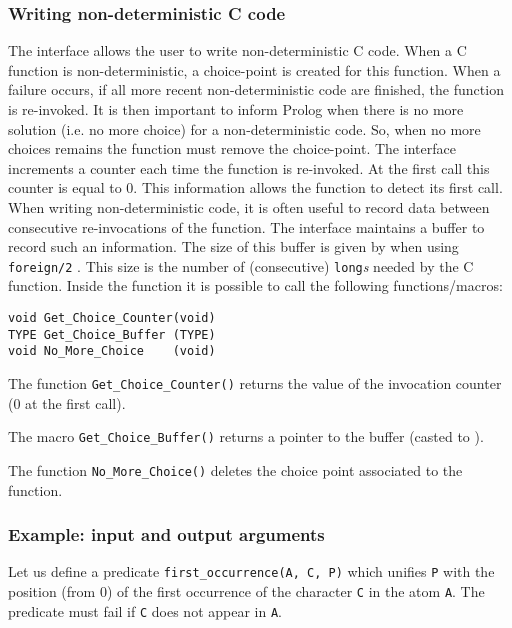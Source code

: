 \subsubsection{Writing non-deterministic C code}
\label{Writing-non-deterministic-C-code}
The interface allows the user to write non-deterministic C code. When a C
function is non-deterministic, a choice-point is created for this function.
When a failure occurs, if all more recent non-deterministic code are
finished, the function is re-invoked. It is then important to inform Prolog
when there is no more solution (i.e. no more choice) for a non-deterministic
code. So, when no more choices remains the function must remove the
choice-point. The interface increments a counter each time the function is
re-invoked. At the first call this counter is equal to 0. This information
allows the function to detect its first call. When writing non-deterministic
code, it is often useful to record data between consecutive re-invocations
of the function. The interface maintains a buffer to record such an
information. The size of this buffer is given by
 when using \texttt{foreign/2}
. This size is the number of (consecutive)
\texttt{long}\emph{s} needed by the C function. Inside the function it is
possible to call the following functions/macros:

\begin{Indentation}
\begin{verbatim}
void Get_Choice_Counter(void)
TYPE Get_Choice_Buffer (TYPE)
void No_More_Choice    (void)
\end{verbatim}
\end{Indentation}

The function \texttt{Get\_Choice\_Counter()} returns the value of the
invocation counter (0 at the first call).

The macro \texttt{Get\_Choice\_Buffer()} returns a
pointer to the buffer (casted to ).

The function \texttt{No\_More\_Choice()} deletes the choice point
associated to the function.

\subsubsection{Example: input and output arguments}
Let us define a predicate \texttt{first\_occurrence(A, C, P)} which unifies
\texttt{P} with the position (from 0) of the first occurrence of the
character \texttt{C} in the atom \texttt{A}. The predicate must fail if
\texttt{C} does not appear in \texttt{A}.

